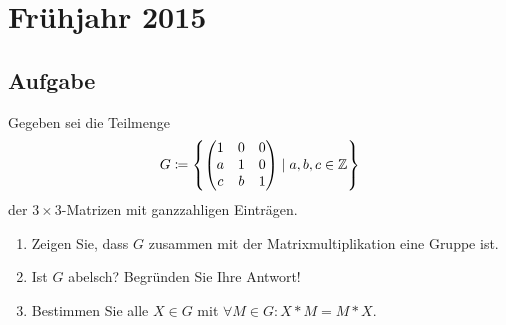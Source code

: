 \section{Frühjahr 2015}

\subsection{Aufgabe}

Gegeben sei die Teilmenge
\begin{equation*}
	G \coloneqq \left\{ \begin{pmatrix}
		1 & 0 & 0 \\
		a & 1 & 0 \\
		c & b & 1
	\end{pmatrix} \mid a,b,c \in \mathbb{Z} \right\}
\end{equation*}
der \( 3 \times 3 \)-Matrizen mit ganzzahligen Einträgen.
\begin{enumerate}
	\item Zeigen Sie, dass \( G \) zusammen mit der Matrixmultiplikation eine Gruppe ist.
	\item Ist \( G \) abelsch? Begründen Sie Ihre Antwort!
	\item Bestimmen Sie alle \( X \in G \) mit \( \forall M \in G: X*M = M*X \).
\end{enumerate}

